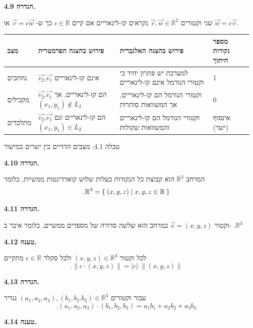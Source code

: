 \documentclass[12pt]{report}
\theoremstyle{plain}
\theoremstyle{definition}
\newcommand{\R}{\mathbb{R}}
\newcommand{\0}{\mathbf{0}}
\begin{document}
\noindent\textbf{הגדרה 4.9.}

שני וקטורים
$\vec{v},\vec{w}\in\R^2$
נקראים
קו-לינאריים אם קיים
$c\in\R$
כך ש-
$\vec{v}=c\vec{w}$
או
$\vec{w}=c\vec{v}$.
\bigskip
\bigskip

\begin{table}[H]
\centering
\begin{tabular}{|>{\raggedleft\arraybackslash}p{2.5cm}|>{\raggedleft\arraybackslash}p{3cm}|>{\raggedleft\arraybackslash}p{3cm}|>{\raggedleft\arraybackslash}p{2.5cm}|}
\hline
\texthebrew{\textbf{מצב}} & \texthebrew{\textbf{פירוש בהצגה הפרמטרית}} & \texthebrew{\textbf{פירוש בהצגה האלגברית}} & \texthebrew{\textbf{מספר נקודות חיתוך}} \\ \hline
\texthebrew{נחתכים} & \texthebrew{$\vec{v_2}$,$\vec{v_1}$ אינם קו-לינאריים} & \texthebrew{למערכת יש פתרון יחיד כי וקטורי הנורמל אינם קו-לינאריים} & \texthebrew{1} \\ \hline
\texthebrew{מקבילים} & \texthebrew{$\vec{v_2}$,$\vec{v_1}$ הם קו-לינאריים, אך $(x_1,y_1)\notin L_2$} & \texthebrew{וקטורי הנורמל הם קו-לינאריים, אך המשוואות סותרות} & \texthebrew{0} \\ \hline
\texthebrew{מתלכדים} & \texthebrew{$\vec{v_2}$,$\vec{v_1}$ הם קו-לינאריים וגם $(x_1,y_1)\in L_2$} & \texthebrew{וקטורי הנורמל הם קו-לינאריים והמשוואות שקולות} & \texthebrew{אינסוף (ישר)} \\ \hline
\end{tabular}

\smallskip
{\small טבלה 4.1: מצבים הדדיים בין ישרים במישור}
\end{table}

\noindent\textbf{הגדרה 4.10.}

המרחב
$\R^3$
הוא קבוצת כל הנקודות בעלות שלוש קוארדינטות ממשיות, כלומר
$$	
.\R^3=\Set{(x,y,z)|x,y,z\in\R}	
$$
\bigskip
\bigskip

\noindent\textbf{הגדרה 4.11.}

וקטור
$\vec{v}=(x,y,z)$
במרחב הוא שלשה סדורה של מספרים ממשיים, כלומר איבר ב-
$.\R^3$
\bigskip
\bigskip

\noindent\textbf{טענה 4.12.}

לכל וקטור
$(x,y,z)\in\R^3$
ולכל סקלר
$c\in\R$
מתקיים
$$
.\|c\cdot(x,y,z)\|=|c|\cdot\|(x,y,z)\|
$$
\bigskip
\bigskip

\noindent\textbf{הגדרה 4.13.}

עבור וקטורים
$(a_1,a_2,a_3),(b_1,b_2.b_3)\in\R^3$
נגדיר
$$
.(a_1,a_2,a_3)\cdot(b_1,b_2,b_3)=a_1b_1+a_2b_2+a_3b_3
$$
\bigskip
\bigskip

\noindent\textbf{טענה 4.14.}
\end{document}
